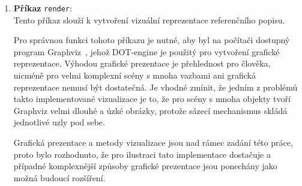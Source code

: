 \begin{enumerate}
	\item \textbf{Příkaz} \texttt{render}: \\
	      Tento příkaz slouží k vytvoření vizuální reprezentace referenčního popisu.

	      Pro správnou funkci tohoto příkazu je nutné, aby byl na počítači dostupný program Graphviz~\cite{graphviz},
	      jehož DOT-engine je použitý pro vytvoření grafické reprezentace.
	      Výhodou grafické prezentace je přehlednost pro člověka, nicméně pro velmi komplexní scény s mnoha vazbami ani grafická reprezentace nemusí být dostatečná.
	      Je vhodné zmínit, že jedním z problémů takto implementované vizualizace je to, že pro scény s mnoha objekty tvoří Graphviz velmi dlouhé a úzké obrázky,
	      protože sázecí mechanismus skládá jednotlivé uzly pod sebe.

	      Grafická prezentace a metody vizualizace jsou nad rámec zadání této práce, proto bylo rozhodnuto, že pro ilustraci tato implementace dostačuje a případné komplexnější
	      způsoby grafické prezentace jsou ponechány jako možná budoucí rozšíření.
\end{enumerate}

